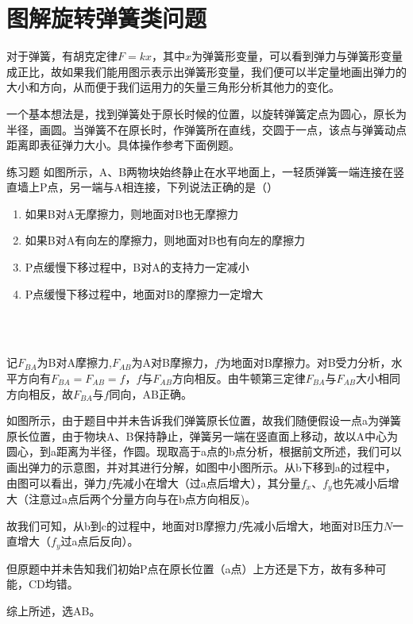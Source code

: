 \section{图解旋转弹簧类问题}

对于弹簧，有胡克定律$F=kx$，其中$x$为弹簧形变量，可以看到弹力与弹簧形变量成正比，故如果我们能用图示表示出弹簧形变量，我们便可以半定量地画出弹力的大小和方向，从而便于我们运用力的矢量三角形分析其他力的变化。

一个基本想法是，找到弹簧处于原长时候的位置，以旋转弹簧定点为圆心，原长为半径，画圆。当弹簧不在原长时，作弹簧所在直线，交圆于一点，该点与弹簧动点距离即表征弹力大小。具体操作参考下面例题。

\begin{ep}{练习题}{}
如图所示，A、B两物块始终静止在水平地面上，一轻质弹簧一端连接在竖直墙上P点，另一端与A相连接，下列说法正确的是（）

\begin{minipage}[b]{0.6\linewidth}
\begin{enumerate}[label=(\Alph*)]
  \item 如果B对A无摩擦力，则地面对B也无摩擦力
  \item 如果B对A有向左的摩擦力，则地面对B也有向左的摩擦力
  \item P点缓慢下移过程中，B对A的支持力一定减小
  \item P点缓慢下移过程中，地面对B的摩擦力一定增大
\end{enumerate}
\end{minipage}
\hfill
\begin{minipage}[b]{0.3\linewidth}

~\\

\end{minipage}
~\\

记$F_{BA}$为B对A摩擦力,$F_{AB}$为A对B摩擦力，$f$为地面对B摩擦力。对B受力分析，水平方向有$F_{BA}=F_{AB}=f$，$f$与$F_{AB}$方向相反。由牛顿第三定律$F_{BA}$与$F_{AB}$大小相同方向相反，故$F_{BA}$与$f$同向，AB正确。



如图所示，由于题目中并未告诉我们弹簧原长位置，故我们随便假设一点a为弹簧原长位置，由于物块A、B保持静止，弹簧另一端在竖直面上移动，故以A中心为圆心，到a距离为半径，作圆。现取高于a点的b点分析，根据前文所述，我们可以画出弹力的示意图，并对其进行分解，如图中小图所示。从b下移到a的过程中，由图可以看出，弹力$f$先减小在增大（过a点后增大），其分量$f_x$、$f_y$也先减小后增大（注意过a点后两个分量方向与在b点方向相反)。

故我们可知，从b到c的过程中，地面对B摩擦力$f$先减小后增大，地面对B压力$N$一直增大（$f_y$过a点后反向）。

但原题中并未告知我们初始P点在原长位置（a点）上方还是下方，故有多种可能，CD均错。

综上所述，选AB。
\end{ep}

